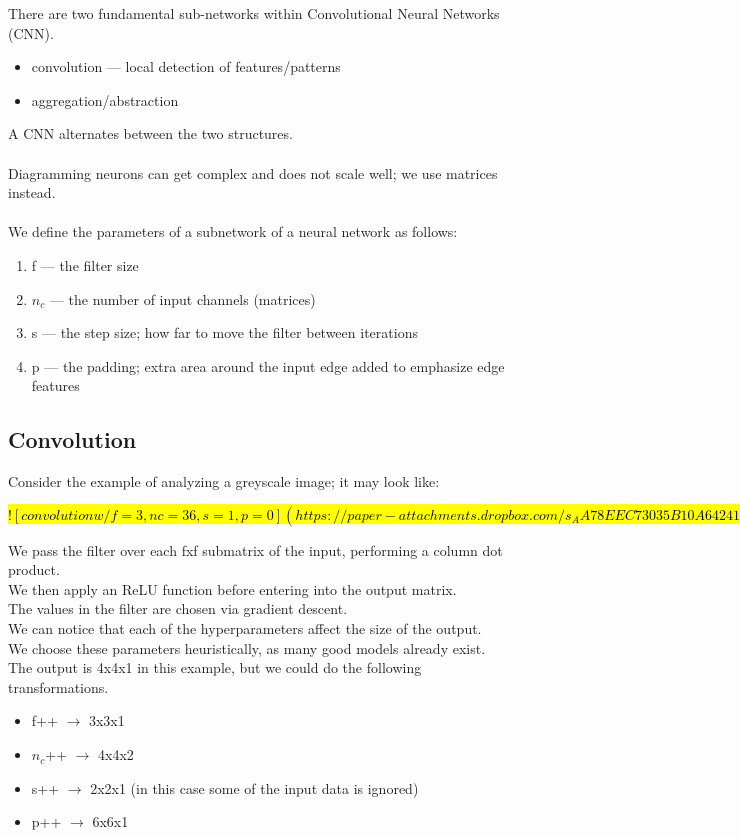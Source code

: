 \documentclass[../../lecture_notes.tex]{subfiles}
\begin{document}
\noindent There are two fundamental sub-networks within Convolutional Neural Networks (CNN).
\begin{itemize} [itemsep=0mm]
	\item convolution — local detection of features/patterns
	\item aggregation/abstraction
\end{itemize}
\noindent A CNN alternates between the two structures.\\
\\
Diagramming neurons can get complex and does not scale well; we use matrices instead.\\
\\
We define the parameters of a subnetwork of a neural network as follows:
\begin{enumerate} [itemsep=0mm]
	\item f — the filter size 
	\item $n_c$ — the number of input channels (matrices)
	\item s — the step size; how far to move the filter between iterations
	\item p — the padding; extra area around the input edge added to emphasize edge features
\end{enumerate}

\subsection*{Convolution}
\noindent Consider the example of analyzing a greyscale image; it may look like:

\hl{
$![convolution w/ f = 3, nc = 36, s = 1, p = 0](https://paper-attachments.dropbox.com/s_AA78EEC73035B10A6424111F8CC18FF4AA14B9B2A8F73FF013C6765837E92F61_1591303343711_Untitled+drawing+1.jpg)$
}

\noindent We pass the filter over each fxf submatrix of the input, performing a column dot product.\\
We then apply an ReLU function before entering into the output matrix.\\
The values in the filter are chosen via gradient descent.\\
We can notice that each of the hyperparameters affect the size of the output.\\
We choose these parameters heuristically, as many good models already exist.\\
The output is 4x4x1 in this example, but we could do the following transformations.
\begin{itemize} [itemsep=0mm]
	\item f++ $\to$ 3x3x1
	\item $n_c$++ $\to$ 4x4x2
	\item s++ $\to$ 2x2x1 (in this case some of the input data is ignored)
	\item p++ $\to$ 6x6x1
\end{itemize}\medskip
\end{document}
